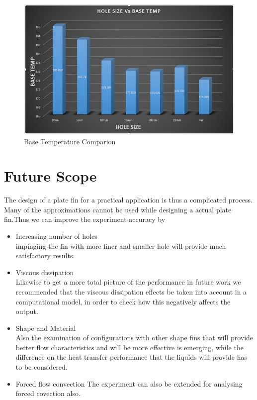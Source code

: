 \begin{figure}[h]
	\label{ss}    %
	\centering
	\includegraphics[width= 11 cm]{118.png}
	\caption{Base Temperature Comparion}
\end{figure}



\chapter{Future Scope}

The design of a plate fin for a practical application is thus a complicated process. Many of the approximations cannot be used while designing a actual plate fin.Thus we can improve the experiment accuracy by 

\begin{itemize}
	\item Increasing number of holes \\
	impinging the fin with more finer and smaller hole will provide much satisfactory results.
	\item Viscous dissipation \\
	Likewise to get a more total picture of the performance in future work we
	recommended that the viscous dissipation effects be taken into account in a
	computational model, in order to check how this negatively affects the output.
	\item Shape and Material \\
	Also the examination of configurations with other shape fins that will
	provide better flow characteristics and will be more effective is emerging, while
	the difference on the heat transfer performance that the liquids will provide has to
	be considered.
	\item Forced flow convection
	The experiment can also be extended for analysing forced covection also.
\end{itemize}


